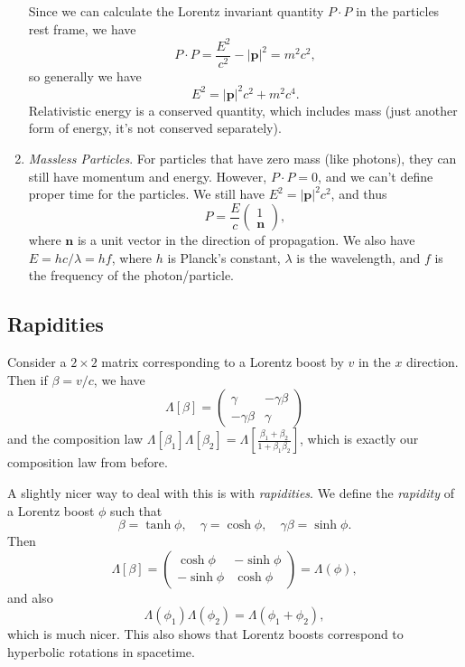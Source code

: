 \documentclass[11pt, a4paper]{scrartcl}
\newcommand{\vv}[1]{\boldsymbol{\mathbf{#1}}}
\theoremstyle{definition}
\begin{document}
\begin{enumerate}
Since we can calculate the Lorentz invariant quantity $P \cdot P$ in the particles rest frame, we have
$$
P \cdot P = \frac{E^2}{c^2} - |\vv p|^2 = m^2 c^2,
$$
so generally we have 
$$
E^2 = |\vv p|^2 c^2 + m^2 c^4.
$$
Relativistic energy is a conserved quantity, which includes mass (just another form of energy, it's not conserved separately).
\item \emph{Massless Particles}. For particles that have zero mass (like photons), they can still have momentum and energy. However, $P \cdot P = 0$, and we can't define proper time for the particles. We still have $E^2 = |\vv p|^2 c^2$, and thus
$$
P = \frac{E}{c} \begin{pmatrix}
	1 \\ \vv n
\end{pmatrix},
$$
where $\vv n$ is a unit vector in the direction of propagation. We also have $E = hc/\lambda = hf$, where $h$ is Planck's constant, $\lambda$ is the wavelength, and $f$ is the frequency of the photon/particle. 
\end{enumerate}

\subsection*{Rapidities}

Consider a $2 \times 2$ matrix corresponding to a Lorentz boost by $v$ in the $x$ direction. Then if $\beta = v/c$, we have
$$
\Lambda[\beta] = \begin{pmatrix}
	\gamma & -\gamma \beta \\
	-\gamma \beta & \gamma
\end{pmatrix}
$$
and the composition law $\Lambda[\beta_1] \Lambda[\beta_2] = \Lambda\left[\frac{\beta_1 + \beta_2}{1 + \beta_1 \beta_2}\right]$,
which is exactly our composition law from before.

A slightly nicer way to deal with this is with \emph{rapidities}.
We define the \emph{rapidity} of a Lorentz boost $\phi$ such that
$$
\beta = \tanh \phi, \quad \gamma = \cosh \phi,\quad \gamma \beta = \sinh \phi.
$$
Then
$$
\Lambda[\beta] = \begin{pmatrix}
	\cosh \phi & - \sinh \phi \\
	-\sinh \phi & \cosh \phi 
\end{pmatrix} = \Lambda(\phi),
$$
and also
$$
\Lambda(\phi_1) \Lambda(\phi_2) = \Lambda(\phi_1 + \phi_2),
$$
which is much nicer. This also shows that Lorentz boosts correspond to hyperbolic rotations in spacetime.
\end{document}
